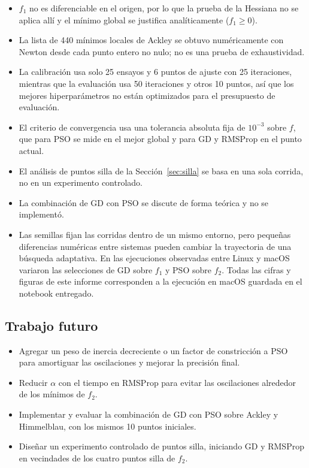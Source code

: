 \begin{itemize}
    \item $f_1$ no es diferenciable en el origen, por lo que la prueba de la
    Hessiana no se aplica allí y el mínimo global se justifica
    analíticamente ($f_1\geq0$).
    \item La lista de 440 mínimos locales de Ackley se obtuvo numéricamente
    con Newton desde cada punto entero no nulo; no es una prueba de
    exhaustividad.
    \item La calibración usa solo 25 ensayos y 6 puntos de ajuste con 25
    iteraciones, mientras que la evaluación usa 50 iteraciones y otros 10
    puntos, así que los mejores hiperparámetros no están optimizados para el
    presupuesto de evaluación.
    \item El criterio de convergencia usa una tolerancia absoluta fija de
    $10^{-3}$ sobre $f$, que para PSO se mide en el mejor global y para GD y
    RMSProp en el punto actual.
    \item El análisis de puntos silla de la Sección~\ref{sec:silla} se basa
    en una sola corrida, no en un experimento controlado.
    \item La combinación de GD con PSO se discute de forma teórica y no se
    implementó.
    \item Las semillas fijan las corridas dentro de un mismo entorno, pero
    pequeñas diferencias numéricas entre sistemas pueden cambiar la
    trayectoria de una búsqueda adaptativa. En las ejecuciones observadas
    entre Linux y macOS variaron las selecciones de GD sobre $f_1$ y PSO
    sobre $f_2$. Todas las cifras y figuras de este informe corresponden
    a la ejecución en macOS guardada en el notebook entregado.
\end{itemize}

\subsection{Trabajo futuro}

\begin{itemize}
    \item Agregar un peso de inercia decreciente o un factor de constricción
    a PSO para amortiguar las oscilaciones y mejorar la precisión final.
    \item Reducir $\alpha$ con el tiempo en RMSProp para evitar las
    oscilaciones alrededor de los mínimos de $f_2$.
    \item Implementar y evaluar la combinación de GD con PSO sobre Ackley
    y Himmelblau, con los mismos 10 puntos iniciales.
    \item Diseñar un experimento controlado de puntos silla, iniciando GD y
    RMSProp en vecindades de los cuatro puntos silla de $f_2$.
\end{itemize}
